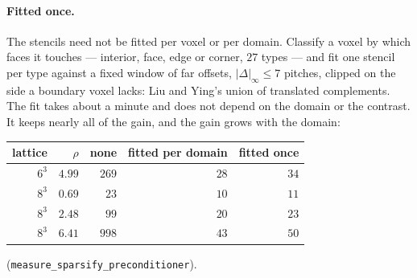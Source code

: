 \documentclass[11pt,a4paper]{article}
\begin{document}
\paragraph{Fitted once.} The stencils need not be fitted per voxel or per domain. Classify a voxel
by which faces it touches --- interior, face, edge or corner, $27$ types --- and fit one stencil
per type against a fixed window of far offsets, $|\Delta|_\infty \le 7$ pitches, clipped on the
side a boundary voxel lacks: Liu and Ying's union of translated complements. The fit takes about
a minute and does not depend on the domain or the contrast. It keeps nearly all of the gain, and
the gain grows with the domain:
\begin{center}
\begin{tabular}{@{}rrrrr@{}}
\toprule
lattice & $\rho$ & none & fitted per domain & fitted once \\
\midrule
$6^3$ & $4.99$ & $269$ & $28$ & $34$\\
$8^3$ & $0.69$ & $23$ & $10$ & $11$\\
$8^3$ & $2.48$ & $99$ & $20$ & $23$\\
$8^3$ & $6.41$ & $998$ & $43$ & $50$\\
\bottomrule
\end{tabular}
\end{center}
(\texttt{measure\_sparsify\_preconditioner}).
\end{document}
